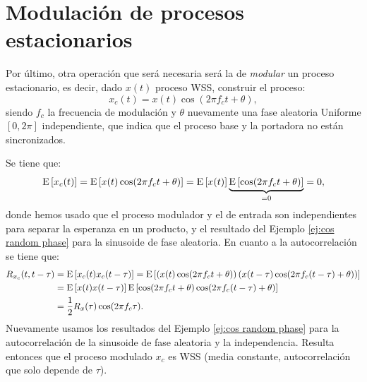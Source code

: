 \begin{ejemplo}
\begin{center}
\hfill
    \end{center}
\end{ejemplo}

\section{Modulación de procesos estacionarios}\label{sec:modulacion wss}

Por último, otra operación que será necesaria será la de \emph{modular} un proceso estacionario, es decir, dado $x(t)$ proceso WSS, construir el proceso:
\begin{equation*}
    x_c(t) = x(t)\cos(2\pi f_c t + \theta),
\end{equation*}
siendo $f_c$ la frecuencia de modulación y $\theta$ nuevamente una fase aleatoria Uniforme$[0,2\pi]$ independiente, que indica que el proceso base y la portadora no están sincronizados.

Se tiene que:
\begin{equation*}
    \mathrm{E}\left[x_c(t)\right] = \mathrm{E}\left[x(t) \cos(2\pi f_c t+\theta)\right] = \mathrm{E}\left[x(t)\right] \underbrace{\mathrm{E}\left[\cos(2\pi f_c t + \theta)\right]}_{=0} = 0,
\end{equation*}
donde hemos usado que el proceso modulador y el de entrada son independientes para separar la esperanza en un producto, y el resultado del Ejemplo \ref{ej:cos random phase} para la sinusoide de fase aleatoria. En cuanto a la autocorrelación se tiene que:
\begin{align*}
    R_{x_c}(t,t-\tau) &= \mathrm{E}\left[x_c(t)x_c(t-\tau)\right] = \mathrm{E}\left[\left(x(t) \cos(2\pi f_c t+\theta)\right) \left(x(t-\tau) \cos(2\pi f_c (t-\tau) +\theta)\right)\right] \\
    &=\mathrm{E}\left[x(t)x(t-\tau)\right]\mathrm{E}\left[\cos(2\pi f_c t+\theta) \cos(2\pi f_c (t-\tau)+\theta)\right] \\
    &=\frac{1}{2} R_x(\tau)\cos(2\pi f_c \tau).
\end{align*}
Nuevamente usamos los resultados del Ejemplo \ref{ej:cos random phase} para la autocorrelación de la sinusoide de fase aleatoria y la independencia. Resulta entonces que el proceso modulado $x_c$ es WSS (media constante, autocorrelación que solo depende de $\tau$).

